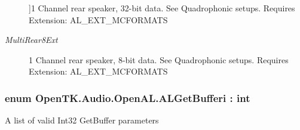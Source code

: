 \begin{Desc}
\begin{description}
{}]1 Channel rear speaker, 32-\/bit data. See Quadrophonic setups. Requires Extension\-: A\-L\-\_\-\-E\-X\-T\-\_\-\-M\-C\-F\-O\-R\-M\-A\-T\-S\item[{\em 
\hypertarget{namespace_open_t_k_1_1_audio_1_1_open_a_l_a4223e02452abfb5070f9b9bf1d426ffca16705710a79d836bb943a61762d60bd0}{Multi\-Rear8\-Ext}\label{namespace_open_t_k_1_1_audio_1_1_open_a_l_a4223e02452abfb5070f9b9bf1d426ffca16705710a79d836bb943a61762d60bd0}
}]1 Channel rear speaker, 8-\/bit data. See Quadrophonic setups. Requires Extension\-: A\-L\-\_\-\-E\-X\-T\-\_\-\-M\-C\-F\-O\-R\-M\-A\-T\-S\end{description}
\end{Desc}
\hypertarget{namespace_open_t_k_1_1_audio_1_1_open_a_l_a3dbc840329f5802425779e4e8cadedbf}{
\subsubsection[{A\-L\-Get\-Bufferi}]{\setlength{\rightskip}{0pt plus 5cm}enum {\bf Open\-T\-K.\-Audio.\-Open\-A\-L.\-A\-L\-Get\-Bufferi} \-: int}}\label{namespace_open_t_k_1_1_audio_1_1_open_a_l_a3dbc840329f5802425779e4e8cadedbf}


A list of valid Int32 Get\-Buffer parameters

